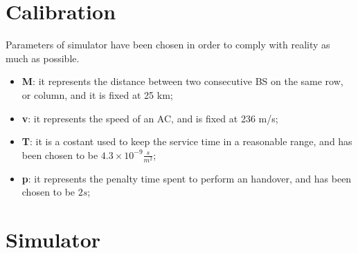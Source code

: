 \documentclass[a4paper,12pt]{article}
\begin{document}
\section{Calibration}
\label{sec:calibration}
Parameters of simulator have been chosen in order to comply with reality as much as possible.
\begin{itemize}
  \item \textbf{M}: it represents the distance between two consecutive BS on the same row, or column, and it is fixed at 25 km;
  \item \textbf{v}: it represents the speed of an AC, and is fixed at 236 m/s;
  \item \textbf{T}: it is a costant used to keep the service time in a reasonable range, and has been chosen to be $4.3 \times 10^{-9} \frac{s}{m^2}$;
  \item \textbf{p}: it represents the penalty time spent to perform an handover, and has been chosen to be $2s$;
\end{itemize}



\section{Simulator}
\end{document}
